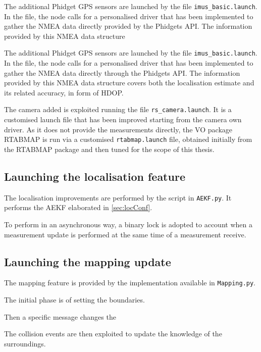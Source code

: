 The additional Phidget \gls{GPS} sensors are launched by the file \texttt{imus\_basic.launch}.
In the file, the node calls for a personalised driver that has been implemented to gather the \gls{NMEA} data directly provided by the Phidgets \gls{API}.
The information provided by this \gls{NMEA} data structure

The additional Phidget \gls{GPS} sensors are launched by the file \texttt{imus\_basic.launch}.
In the file, the node calls for a personalised driver that has been implemented to gather the \gls{NMEA} data directly through the Phidgets \gls{API}.
The information provided by this \gls{NMEA} data structure covers both the localisation estimate and its related accuracy, in form of \gls{HDOP}.

The camera added is exploited running the file \texttt{rs\_camera.launch}.
It is a customised launch file that has been improved starting from the camera own driver.
As it does not provide the measurements directly, the \gls{VO} package \gls{RTABMAP} is run via a customised \texttt{rtabmap.launch} file, obtained initially from the \gls{RTABMAP} package and then tuned for the scope of this thesis.



\subsection{Launching the localisation feature}
\noindent The localisation improvements are performed by the script in \texttt{AEKF.py}.
It performs the \gls{AEKF} elaborated in \ref{sec:locConf}.

To perform in an asynchronous way, a binary lock is adopted to account when a measurement update is performed at the same time of a measurement receive.


\subsection{Launching the mapping update}
\noindent The mapping feature is provided by the implementation available in \texttt{Mapping.py}.

The initial phase is of setting the boundaries.

Then a specific message changes the

The collision events are then exploited to update the knowledge of the surroundings.





\cleardoublepage
